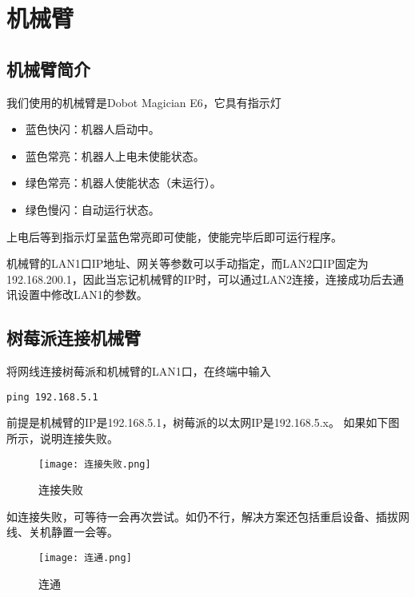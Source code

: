 \chapter{机械臂}
\section{机械臂简介}
我们使用的机械臂是Dobot Magician E6，它具有指示灯
\begin{itemize}
	\item 蓝色快闪：机器人启动中。
	\item 蓝色常亮：机器人上电未使能状态。
	\item 绿色常亮：机器人使能状态（未运行）。
	\item 绿色慢闪：自动运行状态。
\end{itemize}
上电后等到指示灯呈蓝色常亮即可使能，使能完毕后即可运行程序。
\par 
机械臂的LAN1口IP地址、网关等参数可以手动指定，而LAN2口IP固定为192.168.200.1，因此当忘记机械臂的IP时，可以通过LAN2连接，连接成功后去通讯设置中修改LAN1的参数。
\section{树莓派连接机械臂}
将网线连接树莓派和机械臂的LAN1口，在终端中输入
\begin{lstlisting}[style=bashstyle]
	ping 192.168.5.1
\end{lstlisting}
\par
前提是机械臂的IP是192.168.5.1，树莓派的以太网IP是192.168.5.x。
如果如下图所示，说明连接失败。
\begin{figure}[H]
	\centering
	\texttt{[image: 连接失败.png]}
	\caption{连接失败}
	\label{fig:example}
\end{figure}
\par 
如连接失败，可等待一会再次尝试。如仍不行，解决方案还包括重启设备、插拔网线、关机静置一会等。
\begin{figure}[H]
	\centering
	\texttt{[image: 连通.png]}
	\caption{连通}
	\label{fig:example}
\end{figure}
